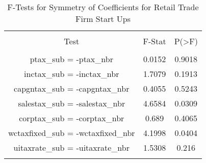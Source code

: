 
\begin{table}[!htbp] \centering 
  \caption{F-Tests for Symmetry of Coefficients for Retail Trade Firm Start Ups} 
  \label{44-45Ftests} 
\begin{tabular}{@{\extracolsep{5pt}} ccc} 
\\[-1.8ex]\hline 
\hline \\[-1.8ex] 
Test & F-Stat & P(\textgreater F) \\ 
\hline \\[-1.8ex] 
ptax\_sub = -ptax\_nbr & 0.0152 & 0.9018 \\ 
inctax\_sub = -inctax\_nbr & 1.7079 & 0.1913 \\ 
capgntax\_sub = -capgntax\_nbr & 0.4055 & 0.5243 \\ 
salestax\_sub = -salestax\_nbr & 4.6584 & 0.0309 \\ 
corptax\_sub = -corptax\_nbr & 0.689 & 0.4065 \\ 
wctaxfixed\_sub = -wctaxfixed\_nbr & 4.1998 & 0.0404 \\ 
uitaxrate\_sub = -uitaxrate\_nbr & 1.5308 & 0.216 \\ 
\hline \\[-1.8ex] 
\end{tabular} 
\end{table} 
